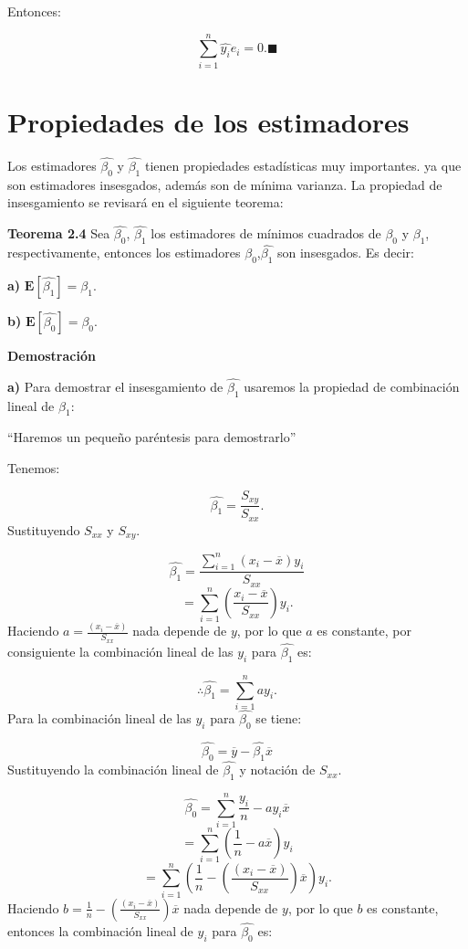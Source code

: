 \documentclass[
  a4paper,
  oneside,
  openany]{book}
\begin{document}
Entonces:

\[\sum_{i=1}^{n}\hat{y_{i}}e_{i}=0. \blacksquare\]

\hypertarget{propiedades-de-los-estimadores}{%
\section{Propiedades de los estimadores}\label{propiedades-de-los-estimadores}}

Los estimadores \(\hat{\beta_{0}}\) y \(\hat{\beta_{1}}\) tienen propiedades estadísticas muy importantes. ya que son estimadores insesgados, además son de mínima varianza. La propiedad de insesgamiento se revisará en el siguiente teorema:

\textbf{Teorema 2.4} Sea \(\hat{\beta_{0}}\), \(\hat{\beta_{1}}\) los estimadores de mínimos cuadrados de \(\beta_{0}\) y \(\beta_{1}\), respectivamente, entonces los estimadores \(\hat{\beta_{0}}\),\(\hat{\beta_{1}}\) son insesgados. Es decir:

\textbf{a)} \(\mathbf{E}\left[\hat{\beta_{1}}\right]=\beta_{1}.\)

\textbf{b)} \(\mathbf{E}\left[\hat{\beta_{0}}\right]=\beta_{0}.\)

\textbf{Demostración}

\textbf{a)} Para demostrar el insesgamiento de \(\hat{\beta_{1}}\) usaremos la propiedad de combinación lineal de \(\beta_{1}:\)

``Haremos un pequeño paréntesis para demostrarlo''

Tenemos:

\[\hat{\beta_{1}}=\frac{S_{xy}}{S_{xx}}.\]
Sustituyendo \(S_{xx}\) y \(S_{xy}\).

\[\hat{\beta_{1}}=\frac{\sum_{i=1}^{n}(x_{i}-\overline{x})y_{i}}{S_{xx}}\]
\[=\sum_{i=1}^{n}\left(\frac{x_{i}-\overline{x}}{S_{xx}}\right)y_{i}.\]
Haciendo \(a=\frac{(x_{i}-\overline{x})}{S_{xx}}\) nada depende de \(y\), por lo que \(a\) es constante, por consiguiente la combinación lineal de las \(y_{i}\) para \(\hat{\beta_{1}}\) es:

\[\therefore \hat{\beta_{1}}=\sum_{i=1}^{n}ay_{i}.\]
Para la combinación lineal de las \(y_{i}\) para \(\hat{\beta_{0}}\) se tiene:

\[\hat{\beta_{0}}=\overline{y}-\hat{\beta_{1}}\overline{x}\]
Sustituyendo la combinación lineal de \(\hat{\beta_{1}}\) y notación de \(S_{xx}.\)

\[\hat{\beta_{0}}=\sum_{i=1}^{n}\frac{y_{i}}{n}-ay_{i}\overline{x}\]
\[=\sum_{i=1}^{n}(\frac{1}{n}-a\overline{x})y_{i}\]
\[=\sum_{i=1}^{n}\left(\frac{1}{n}-\left(\frac{(x_{i}-\overline{x})}{S_{xx}}\right)\overline{x}\right)y_{i}. \]
Haciendo \(b=\frac{1}{n}-\left(\frac{(x_{i}-\overline{x})}{S_{xx}}\right)\overline{x}\) nada depende de \(y\), por lo que \(b\) es constante, entonces la combinación lineal de \(y_{i}\) para \(\hat{\beta_{0}}\) es:
\end{document}
